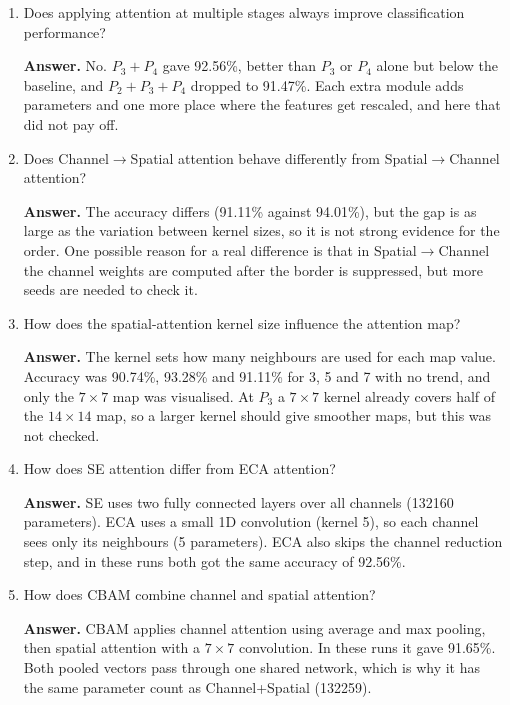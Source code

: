 \documentclass[10pt]{article}
\begin{document}
\begin{enumerate}
\textbf{Answer.} Both maps are flat inside and low only near the border. At $P_4$ the low blocks are larger, as one cell covers $32\times32$ pixels against $8\times8$ at $P_2$. Neither shows the expected change from edges at $P_2$ to whole flower regions at $P_4$.

\item Does applying attention at multiple stages always improve classification performance?

\textbf{Answer.} No. $P_3+P_4$ gave 92.56\%, better than $P_3$ or $P_4$ alone but below the baseline, and $P_2+P_3+P_4$ dropped to 91.47\%. Each extra module adds parameters and one more place where the features get rescaled, and here that did not pay off.

\item Does Channel$\rightarrow$Spatial attention behave differently from Spatial$\rightarrow$Channel attention?

\textbf{Answer.} The accuracy differs (91.11\% against 94.01\%), but the gap is as large as the variation between kernel sizes, so it is not strong evidence for the order. One possible reason for a real difference is that in Spatial$\rightarrow$Channel the channel weights are computed after the border is suppressed, but more seeds are needed to check it.

\item How does the spatial-attention kernel size influence the attention map?

\textbf{Answer.} The kernel sets how many neighbours are used for each map value. Accuracy was 90.74\%, 93.28\% and 91.11\% for 3, 5 and 7 with no trend, and only the $7\times7$ map was visualised. At $P_3$ a $7\times7$ kernel already covers half of the $14\times14$ map, so a larger kernel should give smoother maps, but this was not checked.

\item How does SE attention differ from ECA attention?

\textbf{Answer.} SE uses two fully connected layers over all channels (132160 parameters). ECA uses a small 1D convolution (kernel 5), so each channel sees only its neighbours (5 parameters). ECA also skips the channel reduction step, and in these runs both got the same accuracy of 92.56\%.

\item How does CBAM combine channel and spatial attention?

\textbf{Answer.} CBAM applies channel attention using average and max pooling, then spatial attention with a $7\times7$ convolution. In these runs it gave 91.65\%. Both pooled vectors pass through one shared network, which is why it has the same parameter count as Channel+Spatial (132259).


\end{enumerate}
\end{document}
